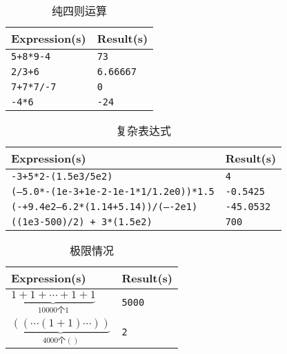 \documentclass[UTF8]{ctexart}
\begin{document}
\begin{table}[!ht]
    \centering
    \begin{tabular}{|l|l|}
    \hline
        \textbf{Expression(s)} & \textbf{Result(s)} \\ \hline
        \texttt{5+8*9-4} & \texttt{73} \\ \hline
        \texttt{2/3+6} & \texttt{6.66667} \\ \hline
        \texttt{7+7*7/-7} & \texttt{0} \\ \hline
        \texttt{-4*6} & \texttt{-24} \\ \hline
    \end{tabular}
    \caption{纯四则运算}
\end{table}
\begin{table}[!ht]
    \centering
    \begin{tabular}{|l|l|}
    \hline
        \textbf{Expression(s)} & \textbf{Result(s)} \\ \hline
        \texttt{-3+5*2-(1.5e3/5e2)} & \texttt{4} \\ \hline
        \texttt{(---5.0*-(1e-3+1e-2-1e-1*1/1.2e0))*1.5} & \texttt{-0.5425} \\ \hline
        \texttt{(-+9.4e2--6.2*(1.14+5.14))/(----2e1)} & \texttt{-45.0532} \\ \hline
        \texttt{((1e3-500)/2) + 3*(1.5e2)} & \texttt{700} \\ \hline
    \end{tabular}
    \caption{复杂表达式}
\end{table}
\begin{table}[!ht]
    \centering
    \begin{tabular}{|l|l|}
    \hline
        \textbf{Expression(s)} & \textbf{Result(s)} \\ \hline
        $\underbrace{1+1+\cdots+1+1}_{10000\text{个}1}$ & \texttt{5000} \\ \hline
        $\underbrace{((\cdots(1+1)\cdots))}_{4000\text{个}()}$ & \texttt{2} \\ \hline
    \end{tabular}
    \caption{极限情况}
\end{table}
\end{document}
